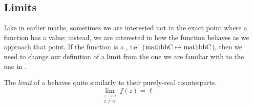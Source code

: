 \subsection{Limits}\label{subsec:Limits}
Like in earlier maths, sometimes we are interested not in the exact point where a function has a value; instead, we are interested in how the function behaves as we approach that point.
If the function is a , i.e.\ ($\operatorname{mathbb{C}} \mapsto \operatorname{mathbb{C}}$), then we need to change our definition of a limit from the one we are familiar with to the one in .

\begin{definition}[Limit]\label{def:Complex_Limit}
  The \emph{limit} of a  behaves quite similarly to their purely-real counterparts.
  \begin{equation}\label{eq:Complex_Limit}
    \lim\limits_{\substack{z \to a \\ z \neq a}} f(z) = \ell
  \end{equation}
\end{definition}


